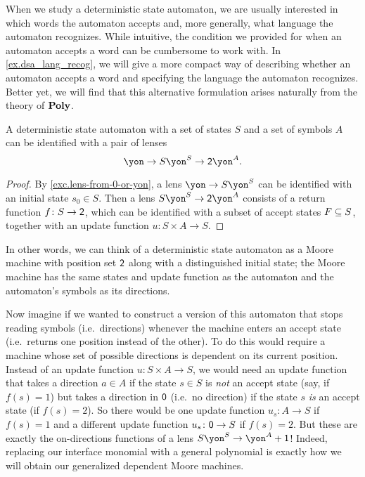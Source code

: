 \documentclass[Book-Poly]{subfiles}
\begin{document}

\begin{remark}
When we study a deterministic state automaton, we are usually interested in which words the automaton accepts and, more generally, what language the automaton recognizes.
While intuitive, the condition we provided for when an automaton accepts a word can be cumbersome to work with.
In \cref{ex.dsa_lang_recog}, we will give a more compact way of describing whether an automaton accepts a word and specifying the language the automaton recognizes.
Better yet, we will find that this alternative formulation arises naturally from the theory of $\poly$.
\end{remark}

\begin{proposition} \label{prop.dsa}
A deterministic state automaton with a set of states $S$ and a set of symbols $A$ can be identified with a pair of lenses
\[
  \yon\to S\yon^S\to \2\yon^A.
\]
\end{proposition}
\begin{proof}
By \cref{exc.lens-from-0-or-yon}, a lens $\yon\to S\yon^S$ can be identified with an initial state $s_0\in S$.
Then a lens $S\yon^S\to\2\yon^A$ consists of a return function $f\colon S\to\2$, which can be identified with a subset of accept states $F \ss S$, together with an update function $u \colon S\times A\to S$.
\end{proof}

In other words, we can think of a deterministic state automaton as a Moore machine with position set $\2$ along with a distinguished initial state; the Moore machine has the same states and update function as the automaton and the automaton's symbols as its directions.

Now imagine if we wanted to construct a version of this automaton that stops reading symbols (i.e.\ directions) whenever the machine enters an accept state (i.e.\ returns one position instead of the other).
To do this would require a machine whose set of possible directions is dependent on its current position.
Instead of an update function $u\colon S\times A\to S$, we would need an update function that takes a direction $a\in A$ if the state $s\in S$ is \emph{not} an accept state (say, if $f(s)=1$) but takes a direction in $\0$ (i.e.\ no direction) if the state $s$ \emph{is} an accept state (if $f(s)=2$).
So there would be one update function $u_s\colon A\to S$ if $f(s)=1$ and a different update function $u_s\colon\0\to S$ if $f(s)=2$.
But these are exactly the on-directions functions of a lens $S\yon^S\to\yon^A+\1$!
Indeed, replacing our interface monomial with a general polynomial is exactly how we will obtain our generalized dependent Moore machines.
\end{document}
